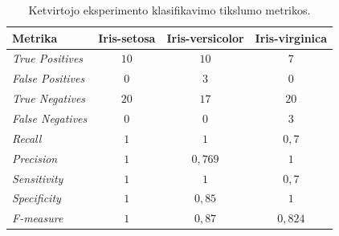 \begin{table}[H]
    \centering
    \caption{Ketvirtojo eksperimento klasifikavimo tikslumo metrikos.}
    \begin{tabular}{|l|c|c|c|}
        \hline
        \textbf{Metrika} & \textbf{Iris-setosa} & \textbf{Iris-versicolor} & \textbf{Iris-virginica} \\
        \hline
        \textit{True Positives}   & $10$  & $10$  & $7$ \\ \hline
        \textit{False Positives}  & $0$  & $3$   & $0$  \\ \hline
        \textit{True Negatives}   & $20$ & $17$  & $20$ \\ \hline
        \textit{False Negatives}  & $0$  & $0$   & $3$  \\ \hline
        \textit{Recall}           & $1$  & $1$       & $0{,}7$ \\ \hline
        \textit{Precision}        & $1$  & $0{,}769$ & $1$ \\ \hline
        \textit{Sensitivity}      & $1$  & $1$       & $0{,}7$ \\ \hline
        \textit{Specificity}      & $1$  & $0{,}85$ & $1$ \\ \hline
        \textit{F-measure}        & $1$  & $0{,}87$ & $0{,}824$ \\ \hline
    \end{tabular}
    \label{tab:eksperimento_nr_4_klasifikavimo_metrikos}
\end{table}